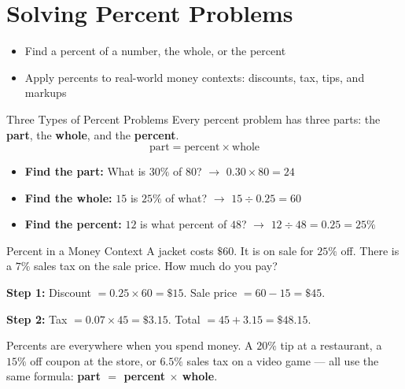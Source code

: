 \section{Solving Percent Problems}

\begin{learningGoals}
\begin{itemize}
    \item Find a percent of a number, the whole, or the percent
    \item Apply percents to real-world money contexts: discounts, tax, tips, and markups
\end{itemize}
\end{learningGoals}

\begin{conceptBox}{Three Types of Percent Problems}
Every percent problem has three parts: the \textbf{part}, the \textbf{whole}, and the \textbf{percent}.
$$\text{part} = \text{percent} \times \text{whole}$$
\begin{itemize}[leftmargin=*]
    \item \textbf{Find the part:} What is $30\%$ of $80$? $\rightarrow$ $0.30 \times 80 = 24$
    \item \textbf{Find the whole:} $15$ is $25\%$ of what? $\rightarrow$ $15 \div 0.25 = 60$
    \item \textbf{Find the percent:} $12$ is what percent of $48$? $\rightarrow$ $12 \div 48 = 0.25 = 25\%$
\end{itemize}
\end{conceptBox}

\begin{workedExample}{Percent in a Money Context}
A jacket costs $\$60$. It is on sale for $25\%$ off. There is a $7\%$ sales tax on the sale price. How much do you pay?

\textbf{Step 1:} Discount $= 0.25 \times 60 = \$15$. Sale price $= 60 - 15 = \$45$.

\textbf{Step 2:} Tax $= 0.07 \times 45 = \$3.15$. Total $= 45 + 3.15 = \$48.15$.
\end{workedExample}

\begin{realWorld}
Percents are everywhere when you spend money. A $20\%$ tip at a restaurant, a $15\%$ off coupon at the store, or $6.5\%$ sales tax on a video game — all use the same formula: \textbf{part $=$ percent $\times$ whole}.
\end{realWorld}

